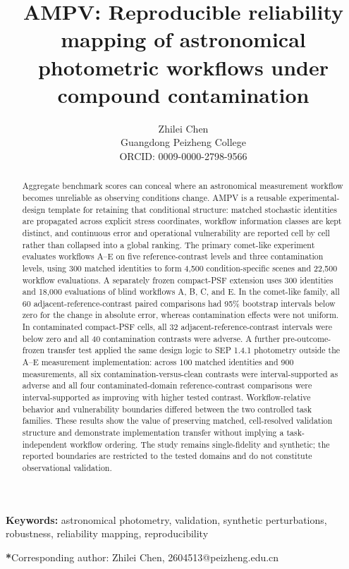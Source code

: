 ﻿\documentclass[12pt]{article}
\title{AMPV: Reproducible reliability mapping of astronomical photometric workflows under compound contamination}
\author{Zhilei Chen\\Guangdong Peizheng College\\ORCID: 0009-0000-2798-9566}
\providecommand{\keywords}[1]{\par\noindent\textbf{Keywords:} #1\par}
\providecommand{\linkable}[1]{#1}
\begin{document}
\maketitle
\begin{abstract}
Aggregate benchmark scores can conceal where an astronomical measurement workflow becomes unreliable as observing conditions change. AMPV is a reusable experimental-design template for retaining that conditional structure: matched stochastic identities are propagated across explicit stress coordinates, workflow information classes are kept distinct, and continuous error and operational vulnerability are reported cell by cell rather than collapsed into a global ranking. The primary comet-like experiment evaluates workflows A--E on five reference-contrast levels and three contamination levels, using 300 matched identities to form 4,500 condition-specific scenes and 22,500 workflow evaluations. A separately frozen compact-PSF extension uses 300 identities and 18,000 evaluations of blind workflows A, B, C, and E. In the comet-like family, all 60 adjacent-reference-contrast paired comparisons had 95\% bootstrap intervals below zero for the change in absolute error, whereas contamination effects were not uniform. In contaminated compact-PSF cells, all 32 adjacent-reference-contrast intervals were below zero and all 40 contamination contrasts were adverse. A further pre-outcome-frozen transfer test applied the same design logic to SEP 1.4.1 photometry outside the A--E measurement implementation: across 100 matched identities and 900 measurements, all six contamination-versus-clean contrasts were interval-supported as adverse and all four contaminated-domain reference-contrast comparisons were interval-supported as improving with higher tested contrast. Workflow-relative behavior and vulnerability boundaries differed between the two controlled task families. These results show the value of preserving matched, cell-resolved validation structure and demonstrate implementation transfer without implying a task-independent workflow ordering. The study remains single-fidelity and synthetic; the reported boundaries are restricted to the tested domains and do not constitute observational validation.
\end{abstract}
\keywords{astronomical photometry, validation, synthetic perturbations, robustness, reliability mapping, reproducibility}
{\noindent \footnotesize\textbf{*}Corresponding author: Zhilei Chen, \linkable{2604513@peizheng.edu.cn}}
\end{document}
